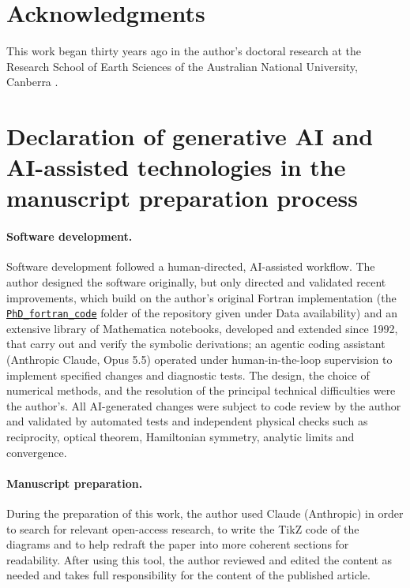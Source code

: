 \documentclass[11pt,a4paper]{article}
\begin{document}
\FloatBarrier


\section*{Acknowledgments}
This work began thirty years ago in the author's doctoral research at the Research School of Earth
Sciences of the Australian National University, Canberra \citep{Nestor1996}.

\section*{Declaration of generative AI and AI-assisted technologies in the manuscript preparation process}
\paragraph{Software development.} Software development followed a human-directed, AI-assisted
workflow. The author designed the software originally, but only directed and validated recent
improvements, which build on the author's original Fortran implementation (the
\href{https://github.com/tmnestor/MultipleScatteringCalculations/tree/main/PhD_fortran_code}{\texttt{PhD\_fortran\_code}}
folder of the repository given under Data availability) and an extensive library of Mathematica notebooks, developed and extended since 1992, that carry out and verify the symbolic
derivations; an agentic
coding assistant (Anthropic Claude, Opus 5.5) operated under human-in-the-loop supervision to implement
specified changes and diagnostic tests. The design, the choice of numerical methods, and the resolution
of the principal technical difficulties were the author's. All AI-generated changes were subject to code
review by the author and validated by automated tests and independent physical checks such as
reciprocity, optical theorem, Hamiltonian symmetry, analytic limits and convergence.

\paragraph{Manuscript preparation.} During the preparation of this work, the author used Claude
(Anthropic) in order to search for relevant open-access research, to write the TikZ code of the
diagrams and to help redraft the paper into more coherent sections for readability. After using this tool, the author reviewed and edited the content
as needed and takes full responsibility for the content of the published article.



\end{document}
